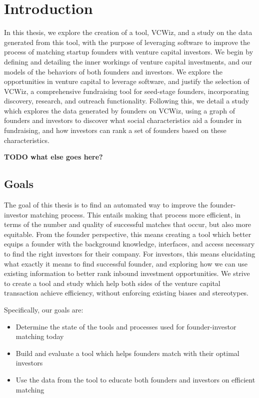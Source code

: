 \chapter{Introduction}

In this thesis, we explore the creation of a tool, VCWiz, and a study on the data generated from this tool, with the purpose of leveraging software to improve the process of matching startup founders with venture capital investors. We begin by defining and detailing the inner workings of venture capital investments, and our models of the behaviors of both founders and investors. We explore the opportunities in venture capital to leverage software, and justify the selection of VCWiz, a comprehensive fundraising tool for seed-stage founders, incorporating discovery, research, and outreach functionality. Following this, we detail a study which explores the data generated by founders on VCWiz, using a graph of founders and investors to discover what social characteristics aid a founder in fundraising, and how investors can rank a set of founders based on these characteristics.

\textbf{TODO what else goes here?}

\section{Goals}

The goal of this thesis is to find an automated way to improve the founder-investor matching process. This entails making that process more efficient, in terms of the number and quality of successful matches that occur, but also more equitable. From the founder perspective, this means creating a tool which better equips a founder with the background knowledge, interfaces, and access necessary to find the right investors for their company. For investors, this means elucidating what exactly it means to find successful founder, and exploring how we can use existing information to better rank inbound investment opportunities.  We strive to create a tool and study which help both sides of the venture capital transaction achieve efficiency, without enforcing existing biases and stereotypes.

Specifically, our goals are:

\begin{itemize}
  \item Determine the state of the tools and processes used for founder-investor matching today
  \item Build and evaluate a tool which helps founders match with their optimal investors
  \item Use the data from the tool to educate both founders and investors on efficient matching
\end{itemize}

